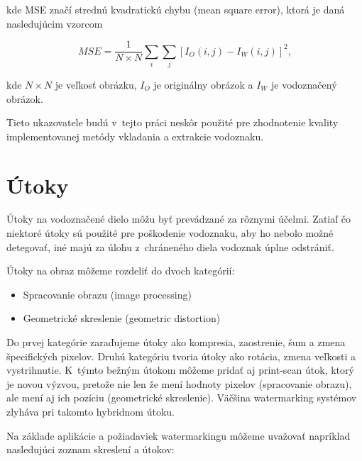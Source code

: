 kde MSE značí strednú kvadratickú chybu (mean square error), ktorá je daná nasledujúcim vzorcom

\begin{equation}
MSE = \frac{1}{N\times N} \sum_i \sum_j[I_O(i,j) - I_W(i,j)]^2,
\end{equation}

kde $N\times N$ je veľkosť obrázku, $I_O$ je originálny obrázok a $I_W$ je vodoznačený obrázok. \cite{QRdecomposition}

Tieto ukazovatele budú v~tejto práci neskôr použité pre zhodnotenie kvality implementovanej metódy vkladania a extrakcie vodoznaku.

\section{Útoky}
Útoky na vodoznačené dielo môžu byť prevádzané za rôznymi účelmi. Zatiaľ čo niektoré útoky sú použité pre poškodenie vodoznaku, aby ho nebolo možné detegovať, iné majú za úlohu z~chráneného diela vodoznak úplne odstrániť.

Útoky na obraz môžeme rozdeliť do dvoch kategórií:
\begin{itemize}
\item Spracovanie obrazu (image processing)
\item Geometrické skreslenie (geometric distortion)
\end{itemize}

Do prvej kategórie zaraďujeme útoky ako kompresia, zaostrenie, šum a zmena špecifických pixelov. Druhú kategóriu tvoria útoky ako rotácia, zmena veľkosti a vystrihnutie. K~týmto bežným útokom môžeme pridať aj print-scan útok, ktorý je novou výzvou, pretože nie len že mení hodnoty pixelov (spracovanie obrazu), ale mení aj ich pozíciu (geometrické skreslenie). Väčšina watermarking systémov zlyháva pri takomto hybridnom útoku. \cite{Chen}

Na základe aplikácie a požiadaviek watermarkingu môžeme uvažovať napríklad nasledujúci zoznam skreslení a útokov: \cite{Katzenbeisser}

